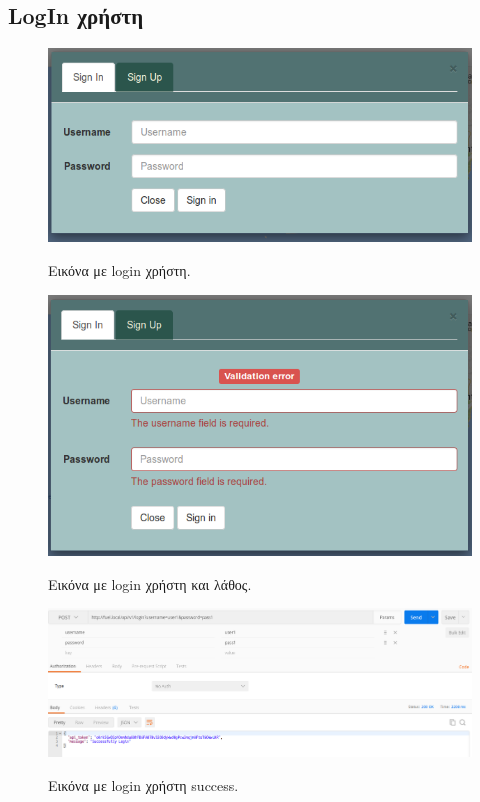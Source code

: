 \subsection{LogIn χρήστη}

\begin{figure}[H]
  \caption{Εικόνα με login χρήστη.}
  \centering
    \includegraphics[width=1\textwidth]{img/login.png}
    \label{fig:login}
\end{figure}

\begin{figure}[H]
  \caption{Εικόνα με login χρήστη και λάθος.}
  \centering
    \includegraphics[width=1\textwidth]{img/login-error.png}
    \label{fig:login-error}
\end{figure}

\begin{figure}[H]
  \caption{Εικόνα με login χρήστη success.}
  \centering
    \includegraphics[width=1\textwidth]{img/login-post.png}
    \label{fig:login-post}
\end{figure}

